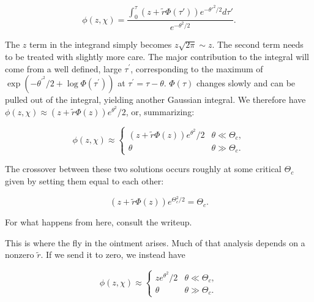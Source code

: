 \documentclass[10pt]{revtex4}
\begin{document}
\begin{equation}
\phi(z,\chi) = \frac{\int_0^\tau (z+\tilde{r}\Phi(\tau\prime)) e^{-\theta\prime^2/2} d\tau\prime}{e^{-\theta^2/2}}.
\end{equation}

The $z$ term in the integrand simply becomes $z\sqrt{2\pi} \sim z$.
The second term needs to be treated with slightly more care.
The major contribution to the integral will come from a well defined, large $\tau^\prime$, corresponding to the maximum of $\exp(-\theta^\prime^2/2 + \log \Phi(\tau^\prime))$ at $\tau^\prime = \tau - \theta$.
$\Phi(\tau)$ changes slowly and can be pulled out of the integral, yielding another Gaussian integral.
We therefore have $\phi(z,\chi) \approx (z+\tilde{r}\Phi(z))e^{\theta^2}/2$, or, summarizing:

\begin{equation}
\phi(z,\chi) \approx
\begin{cases}
(z+\tilde{r}\Phi(z))e^{\theta^2}/2 & \theta \ll \Theta_c, \\
\theta & \theta \gg \Theta_c.
\end{cases}
\end{equation}

The crossover between these two solutions occurs roughly at some critical $\Theta_c$ given by setting them equal to each other: 

\begin{equation}
(z+\tilde{r}\Phi(z))e^{\Theta_c^2/2} = \Theta_c.
\end{equation}

For what happens from here, consult the writeup.

This is where the fly in the ointment arises. Much of that analysis depends on a nonzero $\tilde{r}$.
If we send it to zero, we instead have

\begin{equation}
\phi(z,\chi) \approx
\begin{cases}
ze^{\theta^2}/2 & \theta \ll \Theta_c, \\
\theta & \theta \gg \Theta_c.
\end{cases}
\end{equation}
\end{document}
